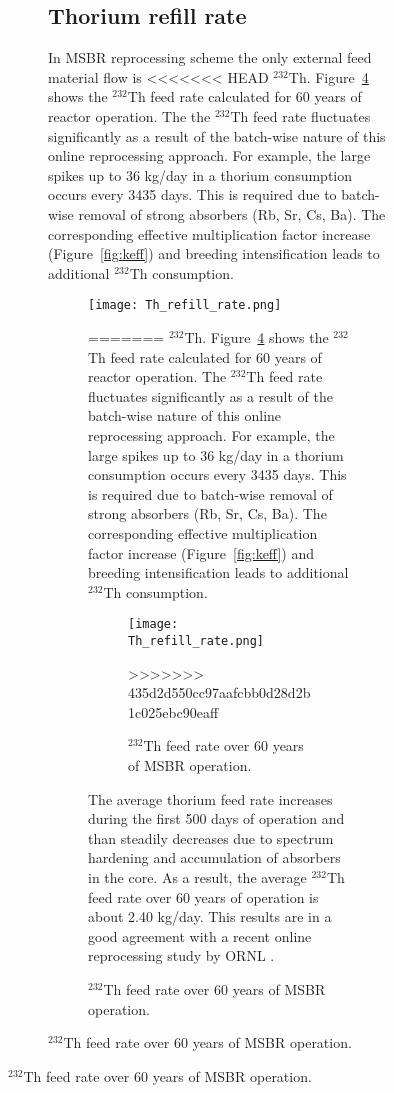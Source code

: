 \begin{figure}[htp!]
\begin{figure}[ht!]
\subsection{Thorium refill rate}
In \gls{MSBR} reprocessing scheme the only external feed material flow  is 
<<<<<<< HEAD
$^{232}$Th. Figure~\ref{fig:th_refill} shows the $^{232}$Th feed rate calculated 
for 60 years of reactor operation. The the $^{232}$Th feed rate fluctuates 
significantly as a result of the batch-wise nature of this online reprocessing 
approach. For example, the large spikes up to 36 kg/day in a thorium consumption 
occurs every 3435 days. This is required due to batch-wise removal of strong 
absorbers (Rb, Sr, Cs, Ba). The corresponding effective multiplication factor 
increase (Figure~\ref{fig:keff}) and breeding intensification leads to 
additional $^{232}$Th consumption. 
\begin{figure}[ht!] %
  \centering
  \texttt{[image: Th\_refill\_rate.png]} 
  \caption{$^{232}$Th feed rate over 60 years of \gls{MSBR} operation.}
=======
$^{232}$Th. Figure~\ref{fig:th_refill} shows the $^{232}$Th feed rate 
calculated for 60 years of reactor operation. The $^{232}$Th feed rate 
fluctuates significantly as a result of the batch-wise nature of this online 
reprocessing approach. For example, the large spikes up to 36 kg/day in a 
thorium consumption occurs every 3435 days. This is required due to batch-wise 
removal of strong absorbers (Rb, Sr, Cs, Ba). The corresponding effective 
multiplication factor increase (Figure~\ref{fig:keff}) and breeding 
intensification leads to additional $^{232}$Th consumption.  
\begin{figure}[ht!] %
  \texttt{[image: Th\_refill\_rate.png]} \caption{$^{232}$Th 
  feed rate over 60 years of \gls{MSBR} operation.}
>>>>>>> 435d2d550cc97aafcbb0d28d2b1c025ebc90eaff
  \label{fig:th_refill}
\end{figure}

The average thorium feed rate increases during the first 500 days of operation 
and than steadily decreases due to spectrum hardening and accumulation of 
absorbers in the core. As a result, the average $^{232}$Th feed rate over 60 
years of operation is about 2.40 kg/day. This results are in a good agreement 
with a recent online reprocessing study by \gls{ORNL} 
\cite{betzler_molten_2017}.


\end{figure}
\end{figure}
\end{figure}
